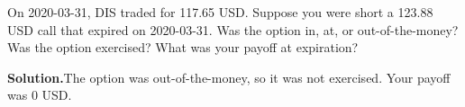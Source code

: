 \noindent On 2020-03-31, DIS traded for 117.65 USD. Suppose you were short a 123.88 USD call that expired on 2020-03-31. Was the option in, at, or out-of-the-money? Was the option exercised? What was your payoff at expiration?

\vspace{9pt} 

\textbf{Solution.}The option was out-of-the-money, so it was not exercised. Your payoff was 0 USD.